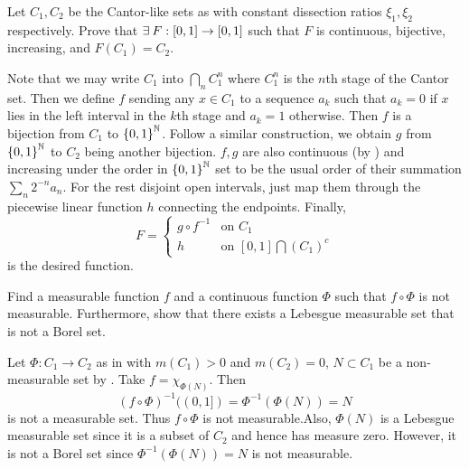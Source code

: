 \begin{exercise}
    Let $C_1,C_2$ be the Cantor-like sets as with constant 
    dissection ratios $\xi_1,\xi_2$ respectively. Prove that 
    $\exists\: F:[0,1]\to[0,1]$ such that $F$ is continuous, 
    bijective, increasing, and $F(C_1) = C_2$.  
\end{exercise}
\begin{pf}
    Note that we may write $C_1$ into $\bigcap_n C_1^n$ where 
    $C_1^n$ is the $n$th stage of the Cantor set. Then we 
    define $f$ sending any $x\in C_1$ to a sequence $a_k$ such 
    that $a_k = 0$ if $x$ lies in the left interval in the $k$th
    stage and $a_k=1$ otherwise. Then $f$ is a bijection from 
    $C_1$ to $\left\{ {0,1} \right\}^{\mathbb{N}}$. Follow a similar construction, 
    we obtain $g$ from $\left\{ {0,1} \right\}^{\mathbb{N}}$ to $C_2$ being another 
    bijection. $f,g$ are also continuous (by ) and 
    increasing under the order in $\left\{ {0,1} \right\}^{\mathbb{N}}$ set to be the 
    usual order of their summation $\sum_n 2^{-n}a_n$. For the 
    rest disjoint open intervals, just map them through the 
    piecewise linear function $h$ connecting the endpoints. 
    Finally, 
    \[
        F = \begin{cases}
            g\circ f^{-1} & \text{on } C_1\\
            h & \text{on } [0,1]\bigcap(C_1)^c
        \end{cases}
    \]
    is the desired function.
\end{pf}

\begin{exercise}
    Find a measurable function $f$ and a continuous function 
    $\Phi$ such that $f\circ\Phi$ is not measurable. 
    Furthermore, show that there exists a Lebesgue measurable 
    set that is not a Borel set.
\end{exercise}
\begin{pf}
    Let $\Phi:C_1\to C_2$ as in  with $m(C_1)>0$ 
    and $m(C_2)=0$, $N\subset C_1$ be a non-measurable set by 
    . Take $f = \chi_{\Phi(N)}$. Then  
    \[
        (f\circ\Phi)^{-1}((0,1]) = \Phi^{-1}(\Phi(N)) = N 
    \]
    is not a measurable set. Thus $f\circ\Phi$ is not 
    measurable.Also, $\Phi(N)$ is a Lebesgue measurable set 
    since it is a subset of $C_2$ and hence has measure zero. 
    However, it is not a Borel set since $\Phi^{-1}(\Phi(N)) 
    = N$ is not measurable.
\end{pf}

